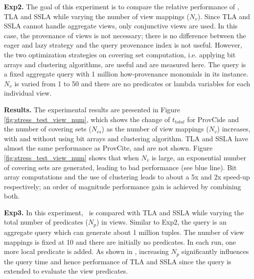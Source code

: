 
\textbf{Exp2.} The goal of this experiment is to compare the relative performance of \provalg, TLA and SSLA while varying the number of view mappings ($N_v$). Since TLA and SSLA cannot handle aggregate views, only conjunctive views are used. In this case, the provenance of views is not necessary; there is no difference between the eager and lazy strategy and the query provenance index is not useful. 
However, the two optimization strategies on covering set computation, i.e. applying bit arrays and clustering algorithms, are useful and are measured here. The query is a fixed aggregate query with 1 million how-provenance monomials in its instance. $N_v$ is varied from 1 to 50 and there are no predicates or lambda variables for each individual view. 

\textbf{Results.}
The experimental results are presented in Figure \ref{fig:stress_test_view_num}, which shows the change of $t_{total}$ for ProvCide and the number of covering sets ($N_{cs}$) as the number of view mappings ($N_v$) increases, with and without using bit arrays and clustering algorithm. TLA and SSLA have almost the same performance as ProvCite, and are not shown. Figure \ref{fig:stress_test_view_num} shows that when $N_v$ is large, an exponential number of covering sets are generated, leading to bad performance (see blue line). Bit array computations and the use of clustering leads to about a 5x and 2x speed-up respectively; an order of magnitude performance gain is achieved by combining both.


\textbf{Exp3.} In this experiment, \provalg\ is compared with TLA and SSLA while varying the total number of predicates ($N_p$) in views. Similar to Exp2, the query is an aggregate query which can generate about 1 million tuples. The number of view mappings is fixed at 10 and there are initially no predicates. In each run, one more local predicate is added. As shown in \cite{wu2018data}, increasing $N_p$  significantly influences the query time and hence performance of TLA and SSLA since the query is extended to evaluate the view predicates. 

